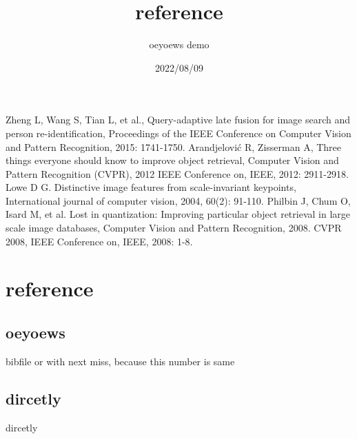 \documentclass{article}
\title{reference}
\author{oeyoews demo}
\date{2022/08/09}
\begin{document}
\maketitle

\begin{thebibliography}{99}
Zheng L, Wang S, Tian L, et al., Query-adaptive late fusion for image search and person re-identification, Proceedings of the IEEE Conference on Computer Vision and Pattern Recognition, 2015: 1741-1750.
Arandjelović R, Zisserman A, Three things everyone should know to improve object retrieval, Computer Vision and Pattern Recognition (CVPR), 2012 IEEE Conference on, IEEE, 2012: 2911-2918.
Lowe D G. Distinctive image features from scale-invariant keypoints, International journal of computer vision, 2004, 60(2): 91-110.
Philbin J, Chum O, Isard M, et al. Lost in quantization: Improving particular object retrieval in large scale image databases, Computer Vision and Pattern Recognition, 2008. CVPR 2008, IEEE Conference on, IEEE, 2008: 1-8.
\end{thebibliography}

\section{reference}




\subsection{oeyoews}%

bibfile or with next miss, because this number is same
\cite{oeyoews}

\subsection{dircetly}%
\label{sub:dircetly}

dircetly
\cite{ref1}
\end{document}
